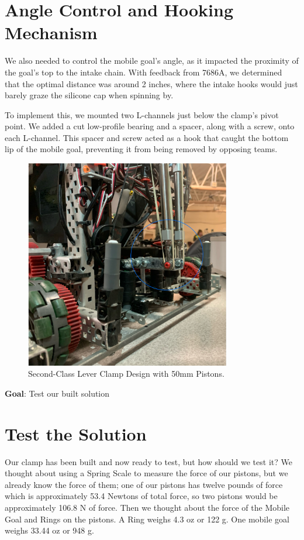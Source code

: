 \section*{Angle Control and Hooking Mechanism}
We also needed to control the mobile goal's angle, as it impacted the proximity of the goal’s top to the intake chain. With feedback from 7686A, we determined that the optimal distance was around 2 inches, where the intake hooks would just barely graze the silicone cap when spinning by.

To implement this, we mounted two L-channels just below the clamp’s pivot point. We added a cut low-profile bearing and a spacer, along with a screw, onto each L-channel. This spacer and screw acted as a hook that caught the bottom lip of the mobile goal, preventing it from being removed by opposing teams.

\begin{figure}[h]
    \centering
    \includegraphics[width=0.8\textwidth]{images/Clamp Lever.jpeg}
    \caption{Second-Class Lever Clamp Design with 50mm Pistons.}
    \label{fig:lever-design}
\end{figure}

\label{Test-the-Solution:-Clamp}
\textbf{Goal}: Test our built solution 
\section*{Test the Solution}
Our clamp has been built and now ready to test, but how should we test it? We thought about using a Spring Scale to measure the force of our pistons, but we already know the force of them; one of our pistons has twelve pounds of force which is approximately 53.4 Newtons of total force, so two pistons would be approximately 106.8 N of force. Then we thought about the force of the Mobile Goal and Rings on the pistons. A Ring weighs 4.3 oz or 122 g. One mobile goal weighs 33.44 oz or 948 g.

